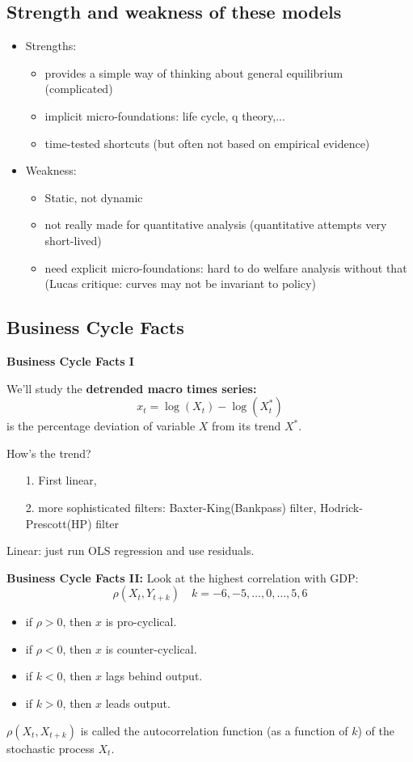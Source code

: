\subsection{Strength and weakness of these models}
\begin{itemize}
  \item Strengths:
    \begin{itemize}
      \item provides a simple way of thinking about general equilibrium
      (complicated)
      \item implicit micro-foundations: life cycle, q theory,...
      \item time-tested shortcuts (but often not based on empirical
      evidence)
    \end{itemize}
  \item Weakness:
    \begin{itemize}
      \item Static, not dynamic
      \item not really made for quantitative analysis (quantitative
      attempts very short-lived)
      \item need explicit micro-foundations: hard to do welfare analysis
      without that (Lucas critique: curves may not be invariant to
      policy)
    \end{itemize}
\end{itemize}

\subsection{Business Cycle Facts}

\textbf{Business Cycle Facts I}

We'll study the \textbf{detrended macro times series:}
\[ x_t = \log (X_t) - \log (X_t^{\ast}) \]
is the percentage deviation of variable $X$ from its trend $X^{\ast}$.

How's the trend?

\begin{enumerate}
  \item[1.] First linear,
  
  \item[2.] more sophisticated filters: Baxter-King(Bankpass) filter,
  Hodrick-Prescott(HP) filter
\end{enumerate}

Linear: just run OLS regression and use residuals.

\textbf{Business Cycle Facts II:}
Look at the highest correlation with GDP:
\[
\rho(X_t, Y_{t+k}) \quad k = -6, -5, \dots, 0, \dots, 5, 6
\]
\begin{itemize}
  \item if $\rho > 0$, then $x$ is pro-cyclical.
  \item if $\rho < 0$, then $x$ is counter-cyclical.
  \item if $k < 0$, then $x$ lags behind output.
  \item if $k > 0$, then $x$ leads output.
\end{itemize}
$\rho(X_t, X_{t+k})$ is called the autocorrelation function (as a function of $k$) of the stochastic process $X_t$.

